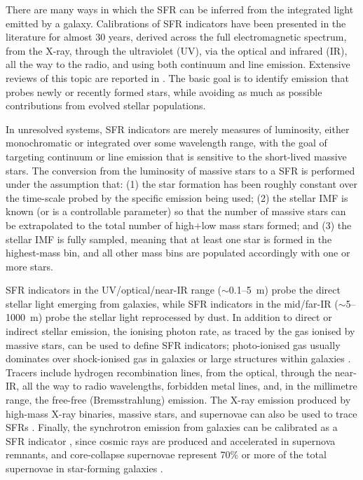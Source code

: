 There are many ways in which the SFR can be inferred from the integrated light emitted by a galaxy. Calibrations of SFR indicators have been presented in the literature for almost 30 years, derived across the full electromagnetic spectrum, from the X-ray, through the ultraviolet (UV), via the optical and infrared (IR), all the way to the radio, and using both continuum and line emission. Extensive reviews of this topic are reported in \cite[e.g.,][]{1998ARA&A..36..189K,2012ARA&A..50..531K,2012MNRAS.420.2190V}. The basic goal is to identify emission that probes newly or recently formed stars, while avoiding as much as possible contributions from evolved stellar populations.

In unresolved systems, SFR indicators are merely measures of luminosity, either monochromatic or integrated over some wavelength range, with the goal of targeting continuum or line emission that is sensitive to the short-lived massive stars. The conversion from the luminosity of massive stars to a SFR is performed under the assumption that: (1) the star formation has been roughly constant over the time-scale probed by the specific emission being used; (2) the stellar IMF is known (or is a controllable parameter) so that the number of massive stars can be extrapolated to the total number of high$+$low mass stars formed; and (3) the stellar IMF is fully sampled, meaning that at least one star is formed in the highest-mass bin, and all other mass bins are populated accordingly with one or more stars.

SFR indicators in the UV/optical/near-IR range ($\sim$0.1--5~\textmu m) probe the direct stellar light emerging from galaxies, while SFR indicators in the mid/far-IR ($\sim$5--1000~\textmu m) probe the stellar light reprocessed by dust. In addition to direct or indirect stellar emission, the ionising photon rate, as traced by the gas ionised by massive stars, can be used to define SFR indicators; photo-ionised gas usually dominates over shock-ionised gas in galaxies or large structures within galaxies \citep[e.g.,][]{2004AJ....127.1405C,2011ApJ...731...45H}. Tracers include hydrogen recombination lines, from the optical, through the near-IR, all the way to radio wavelengths, forbidden metal lines, and, in the millimetre range, the free-free (Bremsstrahlung) emission. The X-ray emission produced by high-mass X-ray binaries, massive stars, and supernovae can also be used to trace SFRs \citep{2017MNRAS.465.3390A}. Finally, the synchrotron emission from galaxies can be calibrated as a SFR indicator \citep{1992ARA&A..30..575C}, since cosmic rays are produced and accelerated in supernova remnants, and core-collapse supernovae represent 70\% or more of the total supernovae in star-forming galaxies \citep{2009A&A...503..137B}.

